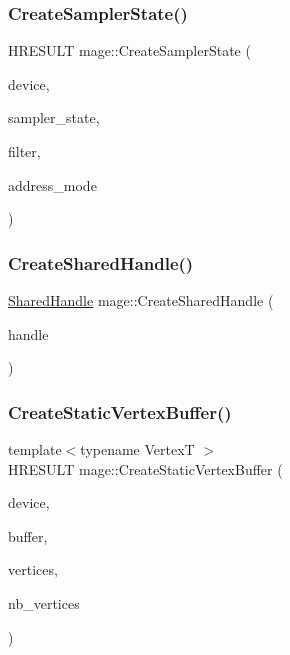 \hypertarget{namespacemage_aba8cfdff9edf018ab6ebe2f3f72a2095}{}\label{namespacemage_aba8cfdff9edf018ab6ebe2f3f72a2095} 
\subsubsection{\texorpdfstring{Create\+Sampler\+State()}{CreateSamplerState()}}
{\footnotesize\ttfamily H\+R\+E\+S\+U\+LT mage\+::\+Create\+Sampler\+State (\begin{DoxyParamCaption}\item[{I\+D3\+D11\+Device2 $\ast$}]{device,  }\item[{I\+D3\+D11\+Sampler\+State $\ast$$\ast$}]{sampler\+\_\+state,  }\item[{D3\+D11\+\_\+\+F\+I\+L\+T\+ER}]{filter,  }\item[{D3\+D11\+\_\+\+T\+E\+X\+T\+U\+R\+E\+\_\+\+A\+D\+D\+R\+E\+S\+S\+\_\+\+M\+O\+DE}]{address\+\_\+mode }\end{DoxyParamCaption})}

\hypertarget{namespacemage_a3119898d7caac71d8ee495c3ae3194b1}{}\label{namespacemage_a3119898d7caac71d8ee495c3ae3194b1} 
\subsubsection{\texorpdfstring{Create\+Shared\+Handle()}{CreateSharedHandle()}}
{\footnotesize\ttfamily \hyperlink{namespacemage_ab892828913d6129acf71e0cec60467e5}{Shared\+Handle} mage\+::\+Create\+Shared\+Handle (\begin{DoxyParamCaption}\item[{H\+A\+N\+D\+LE}]{handle }\end{DoxyParamCaption})}

\hypertarget{namespacemage_a7cf0754e3bc2681bc1990e64f4155032}{}\label{namespacemage_a7cf0754e3bc2681bc1990e64f4155032} 
\subsubsection{\texorpdfstring{Create\+Static\+Vertex\+Buffer()}{CreateStaticVertexBuffer()}}
{\footnotesize\ttfamily template$<$typename VertexT $>$ \\
H\+R\+E\+S\+U\+LT mage\+::\+Create\+Static\+Vertex\+Buffer (\begin{DoxyParamCaption}\item[{I\+D3\+D11\+Device2 $\ast$}]{device,  }\item[{I\+D3\+D11\+Buffer $\ast$$\ast$}]{buffer,  }\item[{const VertexT $\ast$}]{vertices,  }\item[{size\+\_\+t}]{nb\+\_\+vertices }\end{DoxyParamCaption})}

